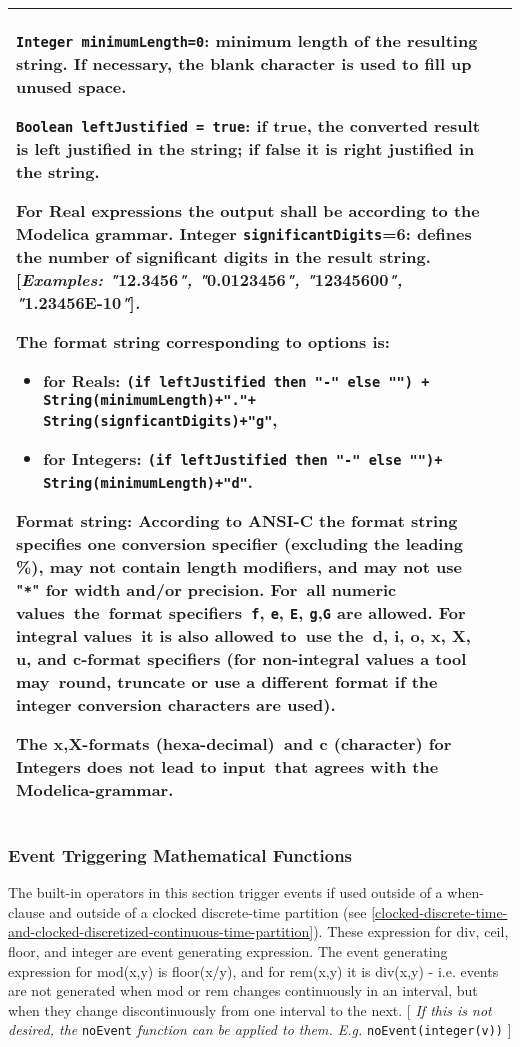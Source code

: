 \begin{longtable}{|p{4.5cm}|p{10cm}|}
\lstinline!Integer minimumLength=0!: minimum length of the resulting string. If
necessary, the blank character is used to fill up unused space.

\lstinline!Boolean leftJustified = true!: if true, the converted result is left
justified in the string; if false it is right justified in the string.

For Real expressions the output shall be according to the Modelica
grammar. Integer \lstinline!significantDigits!=6: defines the number of significant
digits in the result string. {[}\emph{Examples: "}12.3456\emph{",
"}0.0123456\emph{", "}12345600\emph{", "}1.23456E-10\emph{"}{]}\emph{.}

The format string corresponding to options is:

\begin{itemize}
\item
  for Reals: %
  \lstinline!(if leftJustified then "-" else "") +  String(minimumLength)+"."+ String(signficantDigits)+"g"!,
\item
  for Integers: %
  \lstinline!(if leftJustified then "-" else "")+ String(minimumLength)+"d"!.
\end{itemize}

Format string: According to ANSI-C the format string specifies one
conversion specifier (excluding the leading \%), may not contain length
modifiers, and may not use "\lstinline!*!" for width and/or precision. For~all
numeric values~the~format specifiers~\lstinline!f!, \lstinline!e!, \lstinline!E!, \lstinline!g!,\lstinline!G! are allowed. For
integral values~it is also allowed to~use the~d, i, o, x, X, u, and
c-format specifiers (for non-integral values a tool may~round, truncate
or use a different format if the integer conversion characters are
used).

The x,X-formats (hexa-decimal)~and c (character) for Integers does not
lead to input~that agrees with the Modelica-grammar.\\ \hline
\end{longtable}

\subsubsection{Event Triggering Mathematical Functions}

The built-in operators in this section trigger events if used outside of
a when-clause and outside of a clocked discrete-time partition (see
\autoref{clocked-discrete-time-and-clocked-discretized-continuous-time-partition}).
These expression for div, ceil, floor, and integer are
event generating expression. The event generating expression for
mod(x,y) is floor(x/y), and for rem(x,y) it is div(x,y) - i.e. events
are not generated when mod or rem changes continuously in an interval,
  but when they change discontinuously from one interval to the next. {[}
\emph{If this is not desired, the} \lstinline!noEvent! \emph{function can be applied
to them. E.g.} \lstinline!noEvent(integer(v))! {]}

